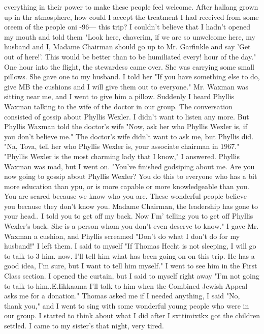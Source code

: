{everything in their power to make these people feel welcome.
After 
hallang grown up in thr 
atmosphere, how could I accept the treatment I had received from some oreem of the people oni 
-96— 
this trip?
I couldn't believe that I hadn't opened my mouth and told them "Look here, 
chaverim, if we are so unwelcome here, my husband and I, Madame Chairman should go up to 
Mr.
Garfinkle and say 'Get out of here!'.
This would be better than to be humiliated every!
hour of the day."
One hour into the flight, the stewardess came over.
She was carrying some small 
pillows.
She gave one to my husband.
I told her "If you have something else to do, give 
MB the cushions and I will give them out to everyone."
Mr.
Waxman was sitting near me, 
and I went to give him a pillow.
Suddenly I heard Phyllis Waxman talking to the wife of 
the doctor in our group.
The conversation consisted of gossip about Phyllis Wexler.
I 
didn't want to listen any more.
But Phyllis Waxman told the doctor's wife "Now, ask her 
who Phyllis Wexler is, if you don't believe me."
The doctor's wife didn't want to ask me, 
but Phyllis did.
"Na, Tova, tell her who Phyllis Wexler is, your associate chairman 
in 1967."
"Phyllis Wexler is the most charming lady that I know," I answered.
Phyllis Waxman 
was mad, but I went on.
"You've finished godsiping about me.
Are you now going to 
gossip about Phyllis Wexler?
You do this to everyone who has a bit more education than 
ypu, or is more capable or more knowledgeable than you.
You are scared because we know 
who you are.
These wonderful people believe you because they don't know you.
Madame 
Chairman, the leadership has gone to your head.. I told you to get off my back.
Now I'm' 
telling you to get off Phyllis Wexler's back.
She is a person whom you don't even deserve 
to know."
I gave Mr.
Waxman a cushion, and Phyllis screamed "Don't do what I don't do for 
my husband!"
I left them.
I said to myself "If Thomas Hecht is not sleeping, I will go to talk to 3 
him.
now.
I'll tell him what has been going on on this trip.
He has a good idea, I'm sure, 
but I want to tell him myself."
I went to see him in the First Class section.
I opened 
the curtain, but I said to myself right away "I'm not going to talk to him..E.Iikkaama I'll 
talk to him when the Combined Jewish Appeal asks me for a donation."
Thomas asked me 
if I needed anything, I said "No, thank you," and I went to sing with some wonderful 
young people who were in our group.
I started to think about what I did after I sxttimixtkx got the children settled.
I came to my sister's that night, very tired.
}
